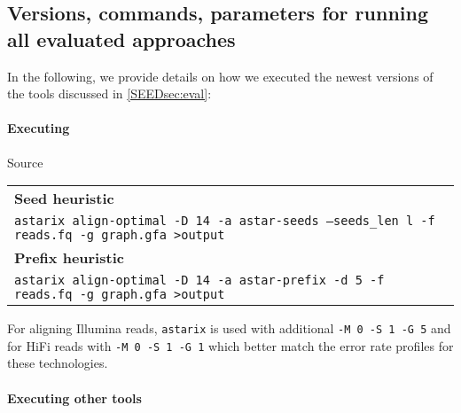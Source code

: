 \subsection{Versions, commands, parameters for running all evaluated approaches} \label{sec:commands}
In the following, we provide details on how we executed the newest versions of
the tools discussed in \cref{SEEDsec:eval}:

\paragraph{Executing \astarix} Source \astarixurl \\

\begin{tabular}{p{10cm}}
	\textbf{Seed heuristic} \\
	\texttt{astarix align-optimal -D 14 -a astar-seeds --seeds\_len l -f reads.fq -g graph.gfa >output} \\
	\textbf{Prefix heuristic} \\
	\texttt{astarix align-optimal -D 14 -a astar-prefix -d 5 -f reads.fq -g graph.gfa >output} \\
\end{tabular}

For aligning Illumina reads, \texttt{astarix} is used with additional \texttt{-M
0 -S 1 -G 5} and for HiFi reads with \texttt{-M 0 -S 1 -G 1} which better match
the error rate profiles for these technologies.

\paragraph{Executing other tools} \phantom{.} \\

